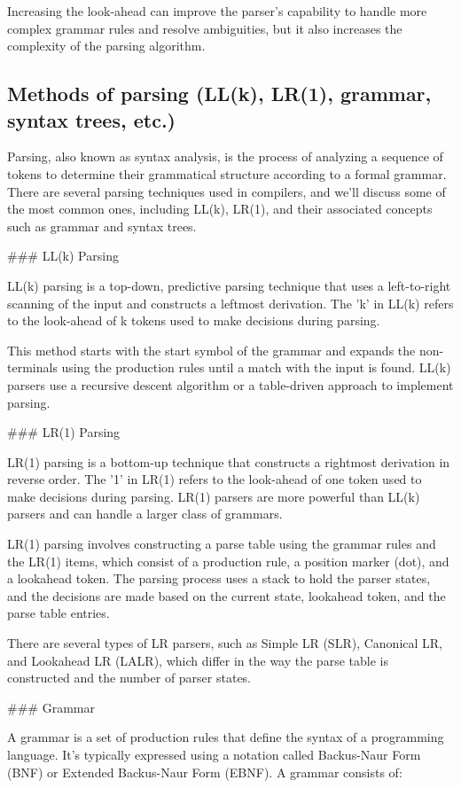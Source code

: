 \documentclass{article}
\begin{document}
Increasing the look-ahead can improve the parser's capability to handle more complex grammar rules and resolve ambiguities, but it also increases the complexity of the parsing algorithm.


\subsection{Methods of parsing (LL(k), LR(1), grammar, syntax trees, etc.)}

Parsing, also known as syntax analysis, is the process of analyzing a sequence of tokens to determine their grammatical structure according to a formal grammar. There are several parsing techniques used in compilers, and we'll discuss some of the most common ones, including LL(k), LR(1), and their associated concepts such as grammar and syntax trees.

### LL(k) Parsing

LL(k) parsing is a top-down, predictive parsing technique that uses a left-to-right scanning of the input and constructs a leftmost derivation. The 'k' in LL(k) refers to the look-ahead of k tokens used to make decisions during parsing.

This method starts with the start symbol of the grammar and expands the non-terminals using the production rules until a match with the input is found. LL(k) parsers use a recursive descent algorithm or a table-driven approach to implement parsing.

### LR(1) Parsing

LR(1) parsing is a bottom-up technique that constructs a rightmost derivation in reverse order. The '1' in LR(1) refers to the look-ahead of one token used to make decisions during parsing. LR(1) parsers are more powerful than LL(k) parsers and can handle a larger class of grammars.

LR(1) parsing involves constructing a parse table using the grammar rules and the LR(1) items, which consist of a production rule, a position marker (dot), and a lookahead token. The parsing process uses a stack to hold the parser states, and the decisions are made based on the current state, lookahead token, and the parse table entries.

There are several types of LR parsers, such as Simple LR (SLR), Canonical LR, and Lookahead LR (LALR), which differ in the way the parse table is constructed and the number of parser states.

### Grammar

A grammar is a set of production rules that define the syntax of a programming language. It's typically expressed using a notation called Backus-Naur Form (BNF) or Extended Backus-Naur Form (EBNF). A grammar consists of:
\end{document}
